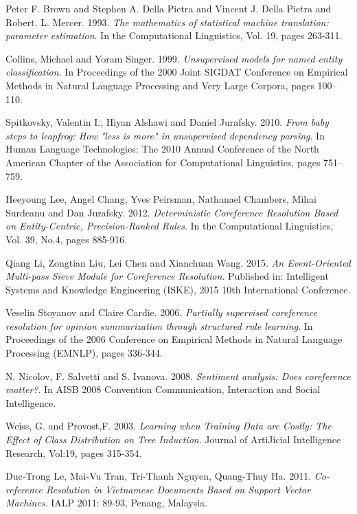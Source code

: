 \documentclass[12pt]{report}
\begin{document}
\begin{thebibliography}{30}
	Peter F. Brown and Stephen A. Della Pietra and Vincent J. Della Pietra and Robert. L. Mercer. 1993.
	\textit{The mathematics of statistical machine translation: parameter estimation}.
	In the Computational Linguistics,  Vol. 19, pages 263-311.

	Collins, Michael and Yoram Singer. 1999.
	\textit{Unsupervised models for named entity classification}.
	In Proceedings of the 2000 Joint SIGDAT Conference on Empirical Methods in Natural Language Processing and Very Large Corpora, pages 100–110.

	Spitkovsky, Valentin I., Hiyan Alshawi and Daniel Jurafsky. 2010.
	\textit{From baby steps to leapfrog: How "less is more" in unsupervised dependency parsing}.
	In Human Language Technologies: The 2010 Annual Conference of the North American Chapter of the Association for Computational Linguistics, pages 751–759.

	Heeyoung Lee, Angel Chang, Yves Peirsman, Nathanael Chambers, Mihai Surdeanu and Dan Jurafsky. 2012.
	\textit{Deterministic Coreference Resolution Based on Entity-Centric, Precision-Ranked Rules}.
	In the Computational Linguistics,  Vol. 39, No.4, pages 885-916.

	Qiang Li, Zongtian Liu, Lei Chen and Xianchuan Wang. 2015.
	\textit{An Event-Oriented Multi-pass Sieve Module for Coreference Resolution}.
	Published in: Intelligent Systems and Knowledge Engineering (ISKE), 2015 10th International Conference.

	Veselin Stoyanov and Claire Cardie. 2006.
	\textit{Partially supervised coreference resolution for opinion summarization through structured rule learning}.
	In Proceedings of the 2006 Conference on Empirical Methods in Natural Language
	Processing (EMNLP), pages 336-344.

	N. Nicolov, F. Salvetti and S. Ivanova. 2008.
	\textit{Sentiment analysis: Does coreference matter?}.
	In AISB 2008 Convention Communication, Interaction and Social Intelligence.	

	Weiss, G. and Provost,F. 2003.
	\textit{Learning when Training Data are Costly: The Effect of Class Distribution on Tree Induction}.
	Journal of ArtiJicial Intelligence Research, Vol:19, pages 315-354.

	Duc-Trong Le, Mai-Vu Tran, Tri-Thanh Nguyen, Quang-Thuy Ha. 2011.
	\textit{Co-reference Resolution in Vietnamese Documents Based on Support Vector Machines}.
	IALP 2011: 89-93, Penang, Malaysia.


\end{thebibliography}
\end{document}
